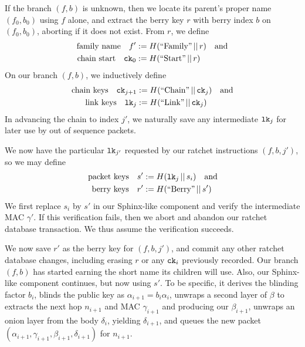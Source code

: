 \documentclass[twoside,letterpaper]{llncs}
\def\mathperiod{.}
\def\mathcomma{}
\def\mathperiod{}
\begin{document}
If the branch $(f,b)$ is unknown, then we locate its parent's
proper name $(f_0,b_0)$ using $f$ alone, and extract the berry
key $r$ with berry index $b$ on $(f_0,b_0)$,
 aborting if it does not exist.
From $r$, we define
\[ \begin{aligned}
\textrm{family name}\quad
 f' &:= H(\textrm{``Family''} \,||\, r) \quad\textrm{and} \\ %
\textrm{chain start}\quad
 \ck_0 &:= H(\textrm{``Start''} \,||\, r) \mathperiod \\
\end{aligned} \]
On our branch $(f,b)$, we inductively define 
\[ \begin{aligned}
\textrm{chain keys}\quad
 \ck_{j+1} &:= H(\textrm{``Chain''} \,||\, \ck_j) \quad\textrm{and} \\ %
\textrm{link keys}\quad
 \lk_j &:= H(\textrm{``Link''} \,||\, \ck_j) \mathperiod \\
\end{aligned} \]
In advancing the chain to index $j'$, we naturally save any 
intermediate $\texttt{lk}_j$ for later use by out of sequence packets.

We now have the particular $\texttt{lk}_{j'}$ requested by our ratchet 
instructions $(f,b,j')$, so we may define 
\[ \begin{aligned}
\textrm{packet keys}\quad 
 s' &:= H(\lk_j \,||\, s_i) \quad\textrm{and} \\ %
\textrm{berry keys}\quad 
 r' &:= H(\textrm{``Berry''} \,||\, s') \mathperiod \\
\end{aligned} \]
We first replace $s_i$ by $s'$ in our Sphinx-like component
and verify the intermediate MAC $\gamma'$.  If this verification
fails, then we abort and abandon our ratchet database transaction.
We thus assume the verification succeeds.  

We now save $r'$ as the berry key for $(f,b,j')$, and commit any
other ratchet database changes, including erasing $r$ or any 
$\texttt{ck}_i$ previously recorded.  Our branch $(f,b)$ has started
earning the short name its children will use.  
Also, our Sphinx-like component continues, but now using $s'$.
To be specific, it derives the blinding factor $b_i$,
blinds the public key as $\alpha_{i+1} = b_i \alpha_i$,
unwraps a second layer of $\beta$ to extracts the
 next hop $n_{i+1}$ and MAC $\gamma_{i+1}$ and 
 producing our $\beta_{i+1}$,
unwraps an onion layer from the body $\delta_i$,
 yielding $\delta_{i+1}$, and queues the new packet
$(\alpha_{i+1},\gamma_{i+1},\beta_{i+1},\delta_{i+1})$ for $n_{i+1}$.
\end{document}
